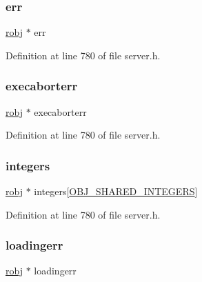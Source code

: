 \subsubsection{\texorpdfstring{err}{err}}
{\footnotesize\ttfamily \hyperlink{server_8h_a540f174d2685422fbd7d12e3cd44c8e2}{robj} $\ast$ err}



Definition at line 780 of file server.\+h.

\mbox{\label{structshared_objects_struct_ae0861a6d46f478570cfa00f797eae1ac}} 
\subsubsection{\texorpdfstring{execaborterr}{execaborterr}}
{\footnotesize\ttfamily \hyperlink{server_8h_a540f174d2685422fbd7d12e3cd44c8e2}{robj} $\ast$ execaborterr}



Definition at line 780 of file server.\+h.

\mbox{\label{structshared_objects_struct_a0a900c43b0635b0afef2c83d7def52c7}} 
\subsubsection{\texorpdfstring{integers}{integers}}
{\footnotesize\ttfamily \hyperlink{server_8h_a540f174d2685422fbd7d12e3cd44c8e2}{robj} $\ast$ integers\mbox{[}\hyperlink{server_8h_a311fc8b18b93af94e1ad418f1386b519}{O\+B\+J\+\_\+\+S\+H\+A\+R\+E\+D\+\_\+\+I\+N\+T\+E\+G\+E\+RS}\mbox{]}}



Definition at line 780 of file server.\+h.

\mbox{\label{structshared_objects_struct_ab0049b4891325314ab168a96180f8500}} 
\subsubsection{\texorpdfstring{loadingerr}{loadingerr}}
{\footnotesize\ttfamily \hyperlink{server_8h_a540f174d2685422fbd7d12e3cd44c8e2}{robj} $\ast$ loadingerr}



